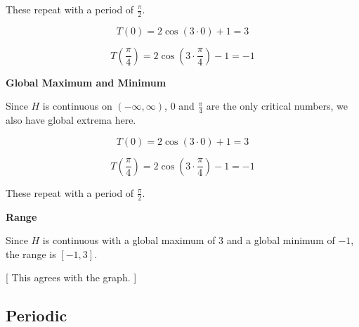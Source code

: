 \documentclass{ximera}
\begin{document}
These repeat with a period of $\frac{\pi}{2}$. 



\[
T\left(0 \right) = 2 \cos\left(3 \cdot 0 \right) + 1 = 3
\]




\[
T\left( \frac{\pi}{4} \right) = 2 \cos\left(3 \cdot \frac{\pi}{4} \right) - 1 = -1
\]














\textbf{\textcolor{blue!55!black}{Global Maximum and Minimum}}


Since $H$ is continuous on $(-\infty, \infty)$, $0$ and $\frac{\pi}{4}$ are the only critical numbers, we also have global extrema here. 





\[
T\left(0 \right) = 2 \cos\left(3 \cdot 0 \right) + 1 = 3
\]




\[
T\left( \frac{\pi}{4} \right) = 2 \cos\left(3 \cdot \frac{\pi}{4} \right) - 1 = -1
\]





These repeat with a period of $\frac{\pi}{2}$. 











\textbf{\textcolor{blue!55!black}{Range}}


Since $H$ is continuous with a global maximum of $3$ and a global minimum of $-1$, the range is $[-1, 3]$.  



[ This agrees with the graph. ]


























\subsection*{Periodic}
\end{document}
